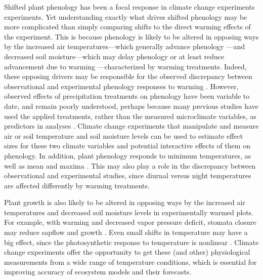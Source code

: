 \documentclass{article}
\begin{document}
\par Shifted plant phenology has been a focal response in climate change experiments experiments. Yet understanding exactly what drives shifted phenology may be more complicated than simply comparing shifts to the direct warming effects of the experiment. This is because phenology is likely to be altered in opposing ways by the increased air temperatures---which generally advance phenology \citep{wolkovich2012}---and decreased soil moisture---which may delay phenology or at least reduce advancement due to warming \citep{penuelas2004,craine2012,matthews2016}---characterized by warming treatments. Indeed, these opposing drivers may be responsible for the observed discrepancy between observational and experimental phenology responses to warming \citep{wolkovich2012}. However, observed effects of precipitation treatments on phenology have been variable to date, and remain poorly understood, perhaps because many previous studies have used the applied treatments, rather than the measured microclimate variables, as predictors in analyses \citep[but see][]{morin2010}. Climate change experiments that manipulate and measure air or soil temperature and soil moisture levels can be used to estimate effect sizes for these two climate variables and potential interactive effects of them on phenology. In addition, plant phenology responds to minimum temperatures, as well as mean and maxima \citep{shen2016,fu2016,piao2015}. This may also play a role in the discrepancy between observational and experimental studies, since diurnal versus night temperatures are affected differently by warming treatments\citep{shen2016,matthews2016}. 
\par Plant growth is also likely to be altered in opposing ways by the increased air temperatures and decreased soil moisture levels in experimentally warmed plots. For example, with warming and decreased vapor pressure deficit, stomata closure may reduce sapflow and growth \citep{templer2016}. Even small shifts in temperature may have a big effect, since the photosynthetic response to temperature is nonlinear \citep{berry1980}. Climate change experiments offer the opportunity to get these (and other) physiological measurements from a wide range of temperature conditions, which is essential for improving accuracy of ecosystem models and their forecasts.  %
\end{document}
